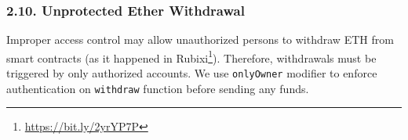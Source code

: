 \subsubsection*{2.10. Unprotected Ether Withdrawal}
Improper access control may allow unauthorized persons to withdraw ETH from smart contracts (as it happened in Rubixi\footnote{\url{https://bit.ly/2yrYP7P}}). Therefore, withdrawals must be triggered by only authorized accounts. We use \texttt{onlyOwner} modifier to enforce authentication on \texttt{withdraw} function before sending any funds.